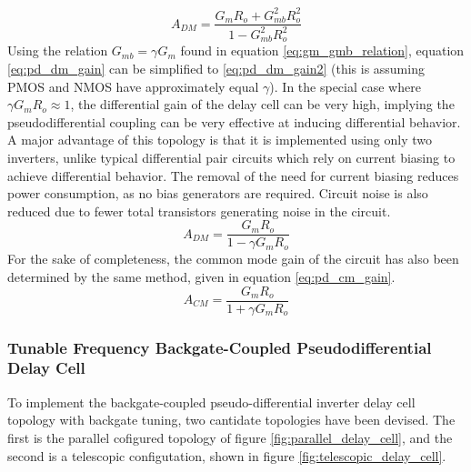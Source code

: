 			\begin{equation}\label{eq:pd_dm_gain}
				A_{DM} = \frac{G_mR_o + G_{mb}^2R_o^2}{1 - G_{mb}^2R_o^2}
			\end{equation}
			Using the relation $G_{mb} = \gamma G_{m}$ found in equation \ref{eq:gm_gmb_relation}, equation \ref{eq:pd_dm_gain} can be simplified to \ref{eq:pd_dm_gain2} (this is assuming PMOS and NMOS have approximately equal $\gamma$). In the special case where $\gamma G_mR_o \approx 1$, the differential gain of the delay cell can be very high, implying the pseudodifferential coupling can be very effective at inducing differential behavior. A major advantage of this topology is that it is implemented using only two inverters, unlike typical differential pair circuits which rely on current biasing to achieve differential behavior. The removal of the need for current biasing reduces power consumption, as no bias generators are required. Circuit noise is also reduced due to fewer total transistors generating noise in the circuit.
			\begin{equation}\label{eq:pd_dm_gain2}
				A_{DM} = \frac{G_mR_o }{1 - \gamma G_mR_o }
			\end{equation}
			For the sake of completeness, the common mode gain of the circuit has also been determined by the same method, given in equation \ref{eq:pd_cm_gain}.
			\begin{equation}\label{eq:pd_cm_gain}
				A_{CM} = \frac{G_mR_o }{1 + \gamma G_mR_o }
			\end{equation}


			\FloatBarrier\subsubsection{Tunable Frequency Backgate-Coupled Pseudodifferential Delay Cell}
			To implement the backgate-coupled pseudo-differential inverter delay cell topology with backgate tuning, two cantidate topologies have been devised. The first is the parallel cofigured topology of figure \ref{fig:parallel_delay_cell}, and the second is a telescopic configutation, shown in figure \ref{fig:telescopic_delay_cell}.

